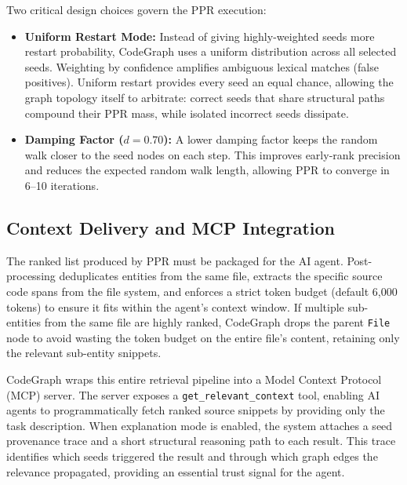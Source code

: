 Two critical design choices govern the PPR execution:
\begin{itemize}
    \item \textbf{Uniform Restart Mode:} Instead of giving highly-weighted seeds more restart probability, CodeGraph uses a uniform distribution across all selected seeds. Weighting by confidence amplifies ambiguous lexical matches (false positives). Uniform restart provides every seed an equal chance, allowing the graph topology itself to arbitrate: correct seeds that share structural paths compound their PPR mass, while isolated incorrect seeds dissipate.
    \item \textbf{Damping Factor ($d=0.70$):} A lower damping factor keeps the random walk closer to the seed nodes on each step. This improves early-rank precision and reduces the expected random walk length, allowing PPR to converge in 6--10 iterations.
\end{itemize}

\subsection{Context Delivery and MCP Integration}

The ranked list produced by PPR must be packaged for the AI agent. Post-processing deduplicates entities from the same file, extracts the specific source code spans from the file system, and enforces a strict token budget (default 6,000 tokens) to ensure it fits within the agent's context window. If multiple sub-entities from the same file are highly ranked, CodeGraph drops the parent \texttt{File} node to avoid wasting the token budget on the entire file's content, retaining only the relevant sub-entity snippets.

CodeGraph wraps this entire retrieval pipeline into a Model Context Protocol (MCP) server. The server exposes a \texttt{get\_relevant\_context} tool, enabling AI agents to programmatically fetch ranked source snippets by providing only the task description. When explanation mode is enabled, the system attaches a seed provenance trace and a short structural reasoning path to each result. This trace identifies which seeds triggered the result and through which graph edges the relevance propagated, providing an essential trust signal for the agent.

